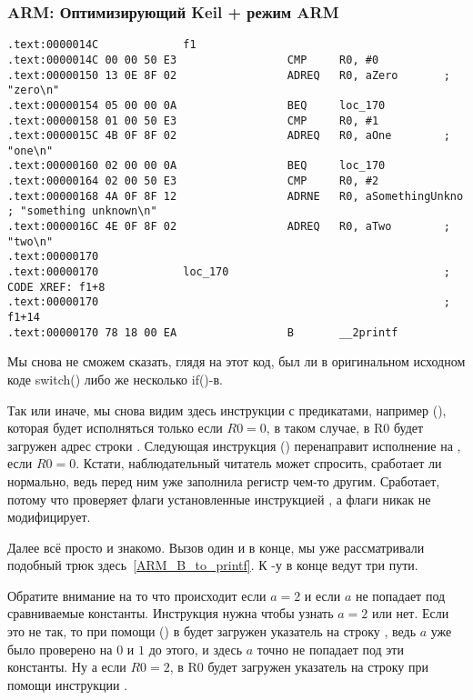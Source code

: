 ﻿%
\subsubsection{ARM: Оптимизирующий Keil + режим ARM}

\begin{lstlisting}
.text:0000014C             f1
.text:0000014C 00 00 50 E3                 CMP     R0, #0
.text:00000150 13 0E 8F 02                 ADREQ   R0, aZero       ; "zero\n"
.text:00000154 05 00 00 0A                 BEQ     loc_170
.text:00000158 01 00 50 E3                 CMP     R0, #1
.text:0000015C 4B 0F 8F 02                 ADREQ   R0, aOne        ; "one\n"
.text:00000160 02 00 00 0A                 BEQ     loc_170
.text:00000164 02 00 50 E3                 CMP     R0, #2
.text:00000168 4A 0F 8F 12                 ADRNE   R0, aSomethingUnkno ; "something unknown\n"
.text:0000016C 4E 0F 8F 02                 ADREQ   R0, aTwo        ; "two\n"
.text:00000170
.text:00000170             loc_170                                 ; CODE XREF: f1+8
.text:00000170                                                     ; f1+14
.text:00000170 78 18 00 EA                 B       __2printf
\end{lstlisting}

Мы снова не сможем сказать, глядя на этот код, был ли в оригинальном исходном коде switch() либо же несколько
if()-в.

Так или иначе, мы снова видим здесь инструкции с предикатами, например  (), 
которая будет исполняться только
если $R0=0$, в таком случае, в R0 будет загружен адрес строки . 
Следующая инструкция  () перенаправит
исполнение на , если $R0=0$. 
Кстати, наблюдательный читатель может спросить, сработает ли  нормально,
ведь  перед ним уже заполнила регистр  чем-то другим. 
Сработает, потому что  проверяет флаги установленные
инструкцией \CMP, а  флаги никак не модифицирует.


Далее всё просто и знакомо. Вызов \printf один и в конце, мы уже рассматривали подобный трюк 
здесь~\ref{ARM_B_to_printf}. К \printf{}-у в конце ведут три пути. 

Обратите внимание на то что происходит
если $a=2$ и если $a$ не попадает под сравниваемые константы. Инструкция  нужна чтобы узнать
$a=2$ или нет. Если это не так, то при помощи  () в  будет загружен указатель на 
строку ,
ведь $a$ уже было проверено на $0$ и $1$ до этого, и здесь $a$ точно не попадает под эти константы. 
Ну а если $R0=2$,
в R0 будет загружен указатель на строку  при помощи инструкции .

